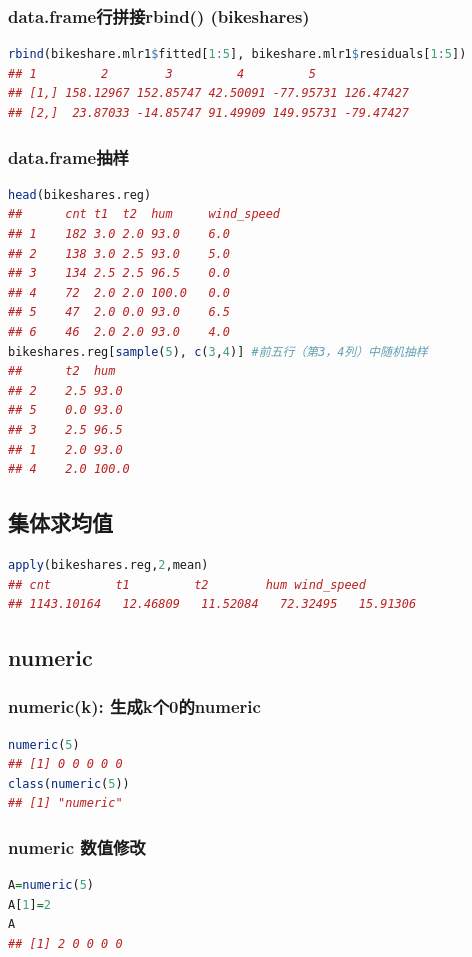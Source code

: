\documentclass[11pt,a4paper]{article}
\begin{document}
\subsubsection{data.frame行拼接rbind() (bikeshares)}
\begin{lstlisting}[language=R]
rbind(bikeshare.mlr1$fitted[1:5], bikeshare.mlr1$residuals[1:5])
## 1         2        3         4         5
## [1,] 158.12967 152.85747 42.50091 -77.95731 126.47427
## [2,]  23.87033 -14.85747 91.49909 149.95731 -79.47427
\end{lstlisting}
\subsubsection{data.frame抽样}
\begin{lstlisting}[language=R]
head(bikeshares.reg)
##      cnt t1  t2  hum     wind_speed
## 1	182	3.0	2.0	93.0	6.0
## 2	138	3.0	2.5	93.0	5.0
## 3	134	2.5	2.5	96.5	0.0
## 4	72	2.0	2.0	100.0	0.0
## 5	47	2.0	0.0	93.0	6.5
## 6	46	2.0	2.0	93.0	4.0
bikeshares.reg[sample(5), c(3,4)] #前五行（第3，4列）中随机抽样
##      t2  hum
## 2	2.5	93.0
## 5	0.0	93.0
## 3	2.5	96.5
## 1	2.0	93.0
## 4	2.0	100.0
\end{lstlisting}

\subsection{集体求均值}
\begin{lstlisting}[language=R]
apply(bikeshares.reg,2,mean)
## cnt         t1         t2        hum wind_speed 
## 1143.10164   12.46809   11.52084   72.32495   15.91306 
\end{lstlisting}





\subsection{numeric}
\subsubsection{numeric(k): 生成k个0的numeric}
\begin{lstlisting}[language=R]
numeric(5)
## [1] 0 0 0 0 0
class(numeric(5))
## [1] "numeric"
\end{lstlisting}
\subsubsection{numeric 数值修改}
\begin{lstlisting}[language=R]
A=numeric(5)
A[1]=2
A
## [1] 2 0 0 0 0
\end{lstlisting}
\end{document}
